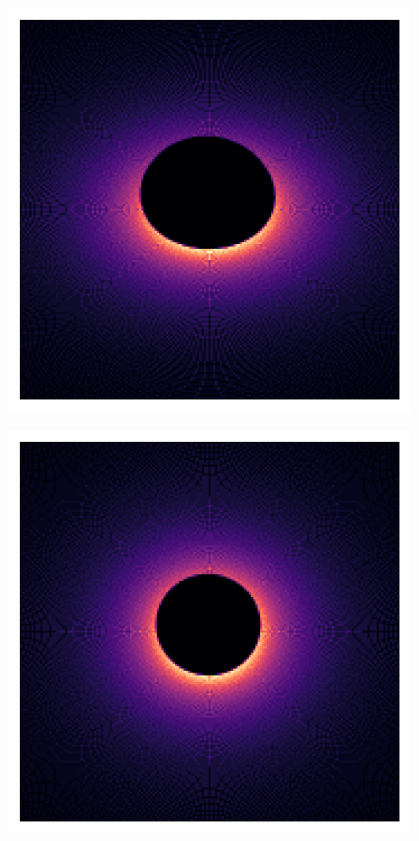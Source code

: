 \documentclass{beamer}
\begin{document}
\begin{frame}{}
    \centering

    \includegraphics[width=0.8\textwidth]{asset/bh_0.5_45.png}

\end{frame}


\begin{frame}{}
    \centering

    \includegraphics[width=0.8\textwidth]{asset/bh_0.75_20.png}

\end{frame}
\end{document}
